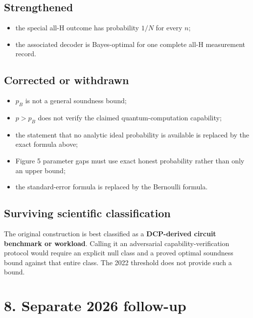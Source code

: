 \documentclass[
  10pt,
]{article}
\providecommand{\tightlist}{%
  \setlength{\itemsep}{0pt}\setlength{\parskip}{0pt}}
\begin{document}
\subsection{Strengthened}\label{strengthened}

\begin{itemize}
\tightlist
\item
  the special all-H outcome has probability \(1/N\) for every \(n\);
\item
  the associated decoder is Bayes-optimal for one complete all-H
  measurement record.
\end{itemize}

\subsection{Corrected or withdrawn}\label{corrected-or-withdrawn}

\begin{itemize}
\tightlist
\item
  \(p_B\) is not a general soundness bound;
\item
  \(p>p_B\) does not verify the claimed quantum-computation capability;
\item
  the statement that no analytic ideal probability is available is
  replaced by the exact formula above;
\item
  Figure 5 parameter gaps must use exact honest probability rather than
  only an upper bound;
\item
  the standard-error formula is replaced by the Bernoulli formula.
\end{itemize}

\subsection{Surviving scientific
classification}\label{surviving-scientific-classification}

The original construction is best classified as a \textbf{DCP-derived
circuit benchmark or workload}. Calling it an adversarial
capability-verification protocol would require an explicit null class
and a proved optimal soundness bound against that entire class. The 2022
threshold does not provide such a bound.

\section{8. Separate 2026 follow-up}\label{separate-2026-follow-up}
\end{document}
